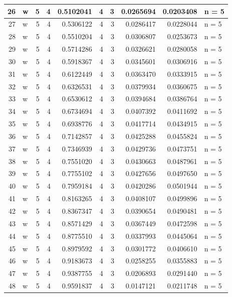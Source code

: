 \documentclass[
  letterpaper,
  DIV=11,
  numbers=noendperiod]{scrreprt}
\begin{document}
\begin{table}
\begin{tabular}[t]{r|l|r|r|r|r|r|r|r|l}
\hline
26 & w & 5 & 4 & 0.5102041 & 4 & 3 & 0.0265694 & 0.0203408 & n = 5\\
\hline
27 & w & 5 & 4 & 0.5306122 & 4 & 3 & 0.0286417 & 0.0228044 & n = 5\\
\hline
28 & w & 5 & 4 & 0.5510204 & 4 & 3 & 0.0306807 & 0.0253673 & n = 5\\
\hline
29 & w & 5 & 4 & 0.5714286 & 4 & 3 & 0.0326621 & 0.0280058 & n = 5\\
\hline
30 & w & 5 & 4 & 0.5918367 & 4 & 3 & 0.0345601 & 0.0306916 & n = 5\\
\hline
31 & w & 5 & 4 & 0.6122449 & 4 & 3 & 0.0363470 & 0.0333915 & n = 5\\
\hline
32 & w & 5 & 4 & 0.6326531 & 4 & 3 & 0.0379934 & 0.0360675 & n = 5\\
\hline
33 & w & 5 & 4 & 0.6530612 & 4 & 3 & 0.0394684 & 0.0386764 & n = 5\\
\hline
34 & w & 5 & 4 & 0.6734694 & 4 & 3 & 0.0407392 & 0.0411692 & n = 5\\
\hline
35 & w & 5 & 4 & 0.6938776 & 4 & 3 & 0.0417714 & 0.0434915 & n = 5\\
\hline
36 & w & 5 & 4 & 0.7142857 & 4 & 3 & 0.0425288 & 0.0455824 & n = 5\\
\hline
37 & w & 5 & 4 & 0.7346939 & 4 & 3 & 0.0429736 & 0.0473751 & n = 5\\
\hline
38 & w & 5 & 4 & 0.7551020 & 4 & 3 & 0.0430663 & 0.0487961 & n = 5\\
\hline
39 & w & 5 & 4 & 0.7755102 & 4 & 3 & 0.0427656 & 0.0497650 & n = 5\\
\hline
40 & w & 5 & 4 & 0.7959184 & 4 & 3 & 0.0420286 & 0.0501944 & n = 5\\
\hline
41 & w & 5 & 4 & 0.8163265 & 4 & 3 & 0.0408107 & 0.0499896 & n = 5\\
\hline
42 & w & 5 & 4 & 0.8367347 & 4 & 3 & 0.0390654 & 0.0490481 & n = 5\\
\hline
43 & w & 5 & 4 & 0.8571429 & 4 & 3 & 0.0367449 & 0.0472598 & n = 5\\
\hline
44 & w & 5 & 4 & 0.8775510 & 4 & 3 & 0.0337993 & 0.0445064 & n = 5\\
\hline
45 & w & 5 & 4 & 0.8979592 & 4 & 3 & 0.0301772 & 0.0406610 & n = 5\\
\hline
46 & w & 5 & 4 & 0.9183673 & 4 & 3 & 0.0258255 & 0.0355883 & n = 5\\
\hline
47 & w & 5 & 4 & 0.9387755 & 4 & 3 & 0.0206893 & 0.0291440 & n = 5\\
\hline
48 & w & 5 & 4 & 0.9591837 & 4 & 3 & 0.0147121 & 0.0211748 & n = 5\\

\end{tabular}
\end{table}
\end{document}
